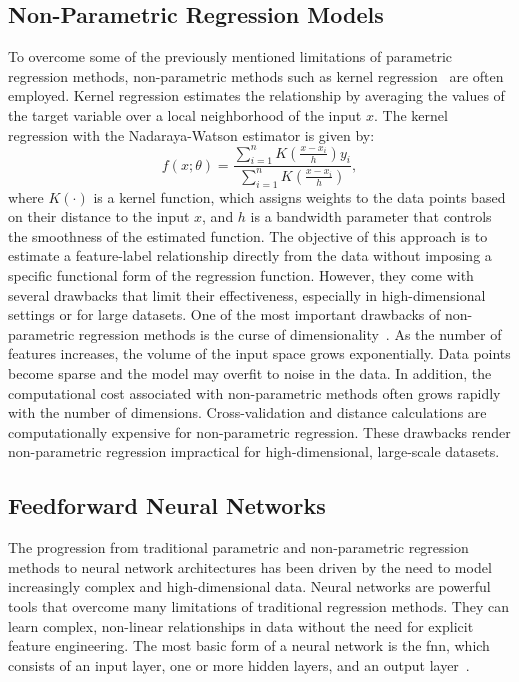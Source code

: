 \subsection{Non-Parametric Regression Models}
To overcome some of the previously mentioned limitations of parametric regression methods, non-parametric methods such as kernel regression~\citep{hastie2009elements} are often employed.
Kernel regression estimates the relationship by averaging the values of the target variable over a local neighborhood of the input $x$.
The kernel regression with the Nadaraya-Watson estimator is given by:
\begin{equation}
    f(x; \theta) = \frac{\sum_{i=1}^{n} K\left(\frac{x-x_i}{h}\right) y_i}{\sum_{i=1}^{n} K\left(\frac{x-x_i}{h}\right)},
\end{equation}
where $K(\cdot)$ is a kernel function, which assigns weights to the data points based on their distance to the input $x$, and $h$ is a bandwidth parameter that controls the smoothness of the estimated function.
The objective of this approach is to estimate a feature-label relationship directly from the data without imposing a specific functional form of the regression function.
However, they come with several drawbacks that limit their effectiveness, especially in high-dimensional settings or for large datasets.
One of the most important drawbacks of non-parametric regression methods is the curse of dimensionality~\cite{bellman1966dynamic}.
As the number of features increases, the volume of the input space grows exponentially.
Data points become sparse and the model may overfit to noise in the data.
In addition, the computational cost associated with non-parametric methods often grows rapidly with the number of dimensions.
Cross-validation and distance calculations are computationally expensive for non-parametric regression.
These drawbacks render non-parametric regression impractical for high-dimensional, large-scale datasets.

\subsection{Feedforward Neural Networks}

The progression from traditional parametric and non-parametric regression methods to neural network architectures has been driven by the need to model increasingly complex and high-dimensional data.
Neural networks are powerful tools that overcome many limitations of traditional regression methods.
They can learn complex, non-linear relationships in data without the need for explicit feature engineering.
The most basic form of a neural network is the \gls{fnn}, which consists of an input layer, one or more hidden layers, and an output layer~\citep{goodfellow2016}.

